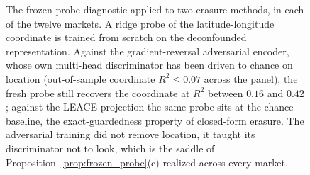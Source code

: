 \begin{figure}[!htbp]
\caption{The frozen-probe diagnostic applied to two erasure methods, in each of the
twelve markets. A ridge probe of the latitude-longitude coordinate is trained from
scratch on the deconfounded representation. Against the gradient-reversal
adversarial encoder, whose own multi-head discriminator has been driven to chance
on location (out-of-sample coordinate $R^2 \le 0.07$ across the panel), the fresh
probe still recovers the coordinate at $R^2$ between $0.16$ and $0.42$; against the
LEACE projection the same probe sits at the chance baseline, the exact-guardedness
property of closed-form erasure. The adversarial training did not remove location,
it taught its discriminator not to look, which is the saddle of
Proposition~\ref{prop:frozen_probe}(c) realized across every market.}
\label{fig:grl-foil}
\end{figure}

